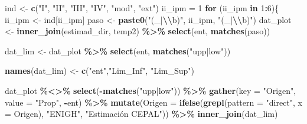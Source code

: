 \documentclass[
  12pt,
]{book}
\newenvironment{Shaded}{\begin{snugshade}}{\end{snugshade}}
\newcommand{\AttributeTok}[1]{\textcolor[rgb]{0.13,0.29,0.53}{#1}}
\newcommand{\ControlFlowTok}[1]{\textcolor[rgb]{0.13,0.29,0.53}{\textbf{#1}}}
\newcommand{\DecValTok}[1]{\textcolor[rgb]{0.00,0.00,0.81}{#1}}
\newcommand{\FunctionTok}[1]{\textcolor[rgb]{0.13,0.29,0.53}{\textbf{#1}}}
\newcommand{\NormalTok}[1]{#1}
\newcommand{\OtherTok}[1]{\textcolor[rgb]{0.56,0.35,0.01}{#1}}
\newcommand{\SpecialCharTok}[1]{\textcolor[rgb]{0.81,0.36,0.00}{\textbf{#1}}}
\newcommand{\StringTok}[1]{\textcolor[rgb]{0.31,0.60,0.02}{#1}}
\begin{document}
\begin{Shaded}
\begin{Highlighting}[]
\NormalTok{ind }\OtherTok{\textless{}{-}} \FunctionTok{c}\NormalTok{(}\StringTok{"I"}\NormalTok{, }\StringTok{"II"}\NormalTok{, }\StringTok{"III"}\NormalTok{, }\StringTok{"IV"}\NormalTok{, }\StringTok{"mod"}\NormalTok{, }\StringTok{"ext"}\NormalTok{)}
\NormalTok{ii\_ipm  }\OtherTok{=} \DecValTok{1}
\ControlFlowTok{for}\NormalTok{ (ii\_ipm }\ControlFlowTok{in} \DecValTok{1}\SpecialCharTok{:}\DecValTok{6}\NormalTok{)\{}
\NormalTok{    ii\_ipm }\OtherTok{\textless{}{-}}\NormalTok{ ind[ii\_ipm]}
\NormalTok{    paso }\OtherTok{\textless{}{-}} \FunctionTok{paste0}\NormalTok{(}\StringTok{"(\_|}\SpecialCharTok{\textbackslash{}\textbackslash{}}\StringTok{b)"}\NormalTok{, ii\_ipm, }\StringTok{"(\_|}\SpecialCharTok{\textbackslash{}\textbackslash{}}\StringTok{b)"}\NormalTok{)}
\NormalTok{    dat\_plot }\OtherTok{\textless{}{-}} \FunctionTok{inner\_join}\NormalTok{(estimad\_dir, temp2) }\SpecialCharTok{\%\textgreater{}\%} 
      \FunctionTok{select}\NormalTok{(ent, }\FunctionTok{matches}\NormalTok{(paso))}
  
\NormalTok{    dat\_lim  }\OtherTok{\textless{}{-}}\NormalTok{ dat\_plot }\SpecialCharTok{\%\textgreater{}\%} \FunctionTok{select}\NormalTok{(ent, }\FunctionTok{matches}\NormalTok{(}\StringTok{"upp|low"}\NormalTok{))}
   
    \FunctionTok{names}\NormalTok{(dat\_lim) }\OtherTok{\textless{}{-}} \FunctionTok{c}\NormalTok{(}\StringTok{"ent"}\NormalTok{,}\StringTok{"Lim\_Inf"}\NormalTok{, }\StringTok{"Lim\_Sup"}\NormalTok{)}
   
\NormalTok{    dat\_plot }\SpecialCharTok{\%\textless{}\textgreater{}\%} \FunctionTok{select}\NormalTok{(}\SpecialCharTok{{-}}\FunctionTok{matches}\NormalTok{(}\StringTok{"upp|low"}\NormalTok{)) }\SpecialCharTok{\%\textgreater{}\%} 
      \FunctionTok{gather}\NormalTok{(}\AttributeTok{key =} \StringTok{"Origen"}\NormalTok{, }\AttributeTok{value =} \StringTok{"Prop"}\NormalTok{, }\SpecialCharTok{{-}}\NormalTok{ent) }\SpecialCharTok{\%\textgreater{}\%} 
      \FunctionTok{mutate}\NormalTok{(}\AttributeTok{Origen =} \FunctionTok{ifelse}\NormalTok{(}\FunctionTok{grepl}\NormalTok{(}\AttributeTok{pattern =} \StringTok{"direct"}\NormalTok{, }\AttributeTok{x =}\NormalTok{ Origen), }
                             \StringTok{"ENIGH"}\NormalTok{, }\StringTok{"Estimación CEPAL"}\NormalTok{)) }\SpecialCharTok{\%\textgreater{}\%} 
      \FunctionTok{inner\_join}\NormalTok{(dat\_lim)}
   

\end{Highlighting}
\end{Shaded}
\end{document}
